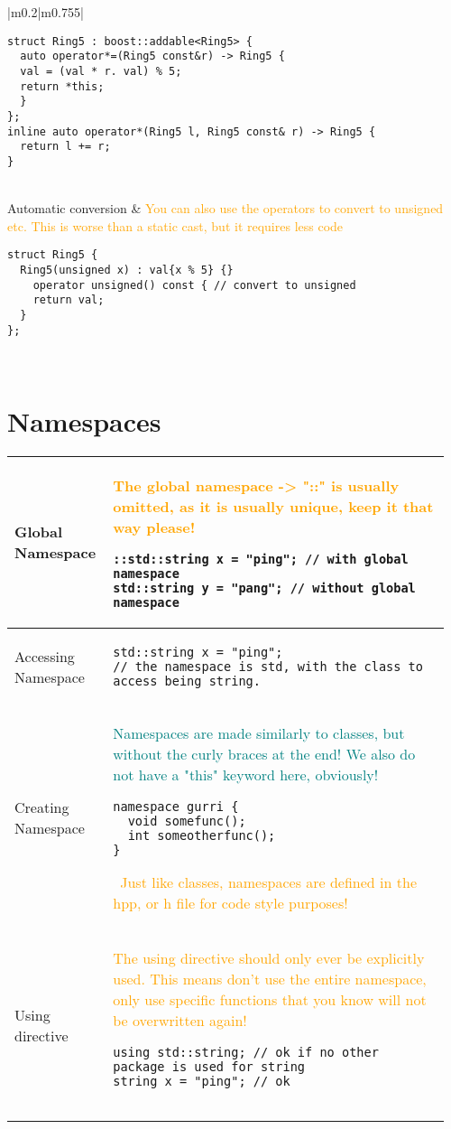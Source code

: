 \documentclass[main.tex,fontsize=8pt,paper=a4,paper=portrait,DIV=calc]{scrartcl}
\begin{document}
\begin{table}[ht!]
\begin{tabular}{|m{0.2\linewidth}|m{0.755\linewidth}|}
\begin{lstlisting}
struct Ring5 : boost::addable<Ring5> {
  auto operator*=(Ring5 const&r) -> Ring5 {
  val = (val * r. val) % 5;
  return *this;
  }
};
inline auto operator*(Ring5 l, Ring5 const& r) -> Ring5 {
  return l += r;
}
\end{lstlisting}\\
\hline
Automatic conversion & 
\textcolor{orange}{You can also use the operators to convert to unsigned etc.\newline
This is worse than a static cast, but it requires less code}\newline
\begin{lstlisting}
struct Ring5 {
  Ring5(unsigned x) : val{x % 5} {}
    operator unsigned() const { // convert to unsigned
    return val;
  }
};
\end{lstlisting}\\
\hline
\end{tabular}
\section{Namespaces}
\begin{tabular}{|m{0.2\linewidth}|m{0.755\linewidth}|}
\hline
Global Namespace & 
\textcolor{orange}{The global namespace -> "::" is usually omitted, as it is usually unique, keep it that way please!}\newline
\begin{lstlisting}
::std::string x = "ping"; // with global namespace
std::string y = "pang"; // without global namespace
\end{lstlisting}\\
\hline
Accessing Namespace & 
\begin{lstlisting}
std::string x = "ping";
// the namespace is std, with the class to access being string.
\end{lstlisting}\\
\hline
Creating Namespace & 
\textcolor{teal}{Namespaces are made similarly to classes, but without the curly braces at the end!\newline
We also do not have a "this" keyword here, obviously!}\newline
\begin{lstlisting}
namespace gurri {
  void somefunc();
  int someotherfunc();
}
\end{lstlisting}
\, \newline
\textcolor{orange}{Just like classes, namespaces are defined in the hpp, or h file for code style purposes!}\\
\hline
Using directive & 
\textcolor{orange}{The using directive should only ever be explicitly used.\newline
This means don't use the entire namespace, only use specific functions that you know will not be overwritten again!}\newline
\begin{lstlisting}
using std::string; // ok if no other package is used for string
string x = "ping"; // ok


\end{lstlisting}
\end{tabular}
\end{table}
\end{document}
